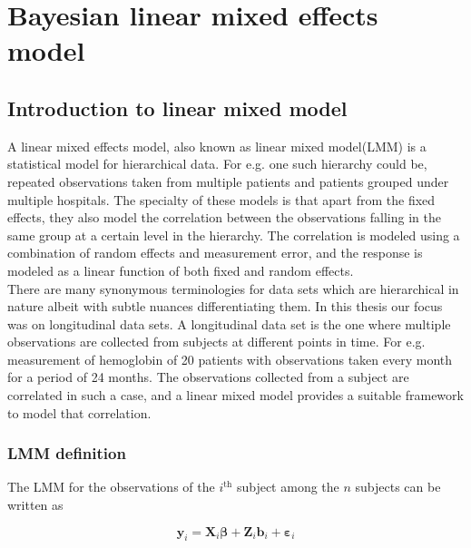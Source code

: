 
\chapter{Bayesian linear mixed effects model}
\label{ch : blmm}

\section{Introduction to linear mixed model}
\label{sec : lmm}
A linear mixed effects model, also known as linear mixed model(LMM) is a statistical model for hierarchical data. For e.g. one such hierarchy could be, repeated observations taken from multiple patients and patients grouped under multiple hospitals. The specialty of these models is that apart from the fixed effects, they also model the correlation between the observations falling in the same group at a certain level in the hierarchy. The correlation is modeled using a combination of random effects and measurement error, and the response is modeled as a linear function of both fixed and random effects.\\

There are many synonymous terminologies for data sets which are hierarchical in nature albeit with subtle nuances differentiating them. In this thesis our focus was on longitudinal data sets. A longitudinal data set is the one where multiple observations are collected from subjects at different points in time. For e.g. measurement of hemoglobin of 20 patients with observations taken every month for a period of 24 months. The observations collected from a subject are correlated in such a case, and a linear mixed model provides a suitable framework to model that correlation.

\subsection{LMM definition}
\label{subsec : lmm_definition}
The LMM for the observations of the $i^\text{th}$ subject among the $n$ subjects can be written as

\begin{equation}
\label{eq : lmm_definition}
\boldsymbol{y}_i = \boldsymbol{X}_{i}\boldsymbol{\beta} + \boldsymbol{Z}_{i}\boldsymbol{b}_{i} + \boldsymbol{\varepsilon}_{i}
\end{equation}

